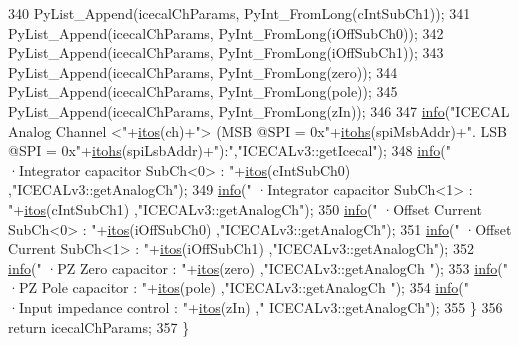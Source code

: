 \begin{DoxyCode}
340         PyList\_Append(icecalChParams, PyInt\_FromLong(cIntSubCh1));
341         PyList\_Append(icecalChParams, PyInt\_FromLong(iOffSubCh0));
342         PyList\_Append(icecalChParams, PyInt\_FromLong(iOffSubCh1));
343         PyList\_Append(icecalChParams, PyInt\_FromLong(zero));
344         PyList\_Append(icecalChParams, PyInt\_FromLong(pole));
345         PyList\_Append(icecalChParams, PyInt\_FromLong(zIn));
346 
347         \hyperlink{classObject_a644fd329ea4cb85f54fa6846484b84a8}{info}(\textcolor{stringliteral}{"ICECAL Analog Channel <"}+\hyperlink{Tools_8h_af330027dbdafb9a30768b3613c553e60}{itos}(ch)+\textcolor{stringliteral}{"> (MSB @SPI = 0x"}+\hyperlink{classICECALv3_a04b02e583f191bfce34d05132cd23834}{itohs}(spiMsbAddr)+\textcolor{stringliteral}{". LSB
       @SPI = 0x"}+\hyperlink{classICECALv3_a04b02e583f191bfce34d05132cd23834}{itohs}(spiLsbAddr)+\textcolor{stringliteral}{"):"},\textcolor{stringliteral}{"ICECALv3::getIcecal"});
348         \hyperlink{classObject_a644fd329ea4cb85f54fa6846484b84a8}{info}(\textcolor{stringliteral}{"   ·Integrator capacitor SubCh<0> : "}+\hyperlink{Tools_8h_af330027dbdafb9a30768b3613c553e60}{itos}(cIntSubCh0)    ,\textcolor{stringliteral}{"ICECALv3::getAnalogCh"});
349         \hyperlink{classObject_a644fd329ea4cb85f54fa6846484b84a8}{info}(\textcolor{stringliteral}{"   ·Integrator capacitor SubCh<1> : "}+\hyperlink{Tools_8h_af330027dbdafb9a30768b3613c553e60}{itos}(cIntSubCh1)    ,\textcolor{stringliteral}{"ICECALv3::getAnalogCh"});
350         \hyperlink{classObject_a644fd329ea4cb85f54fa6846484b84a8}{info}(\textcolor{stringliteral}{"   ·Offset Current SubCh<0>       : "}+\hyperlink{Tools_8h_af330027dbdafb9a30768b3613c553e60}{itos}(iOffSubCh0)    ,\textcolor{stringliteral}{"ICECALv3::getAnalogCh"});
351         \hyperlink{classObject_a644fd329ea4cb85f54fa6846484b84a8}{info}(\textcolor{stringliteral}{"   ·Offset Current SubCh<1>       : "}+\hyperlink{Tools_8h_af330027dbdafb9a30768b3613c553e60}{itos}(iOffSubCh1)    ,\textcolor{stringliteral}{"ICECALv3::getAnalogCh"});
352         \hyperlink{classObject_a644fd329ea4cb85f54fa6846484b84a8}{info}(\textcolor{stringliteral}{"   ·PZ Zero capacitor             : "}+\hyperlink{Tools_8h_af330027dbdafb9a30768b3613c553e60}{itos}(zero)              ,\textcolor{stringliteral}{"ICECALv3::getAnalogCh
      "});
353         \hyperlink{classObject_a644fd329ea4cb85f54fa6846484b84a8}{info}(\textcolor{stringliteral}{"   ·PZ Pole capacitor             : "}+\hyperlink{Tools_8h_af330027dbdafb9a30768b3613c553e60}{itos}(pole)              ,\textcolor{stringliteral}{"ICECALv3::getAnalogCh
      "});
354         \hyperlink{classObject_a644fd329ea4cb85f54fa6846484b84a8}{info}(\textcolor{stringliteral}{"   ·Input impedance control       : "}+\hyperlink{Tools_8h_af330027dbdafb9a30768b3613c553e60}{itos}(zIn)                   ,\textcolor{stringliteral}{"
      ICECALv3::getAnalogCh"});
355     \}
356     \textcolor{keywordflow}{return} icecalChParams;
357 \}
\end{DoxyCode}
\mbox{\label{classICECALv3_a7a1c1706a455903f42bb9a5257d94a78}} 
